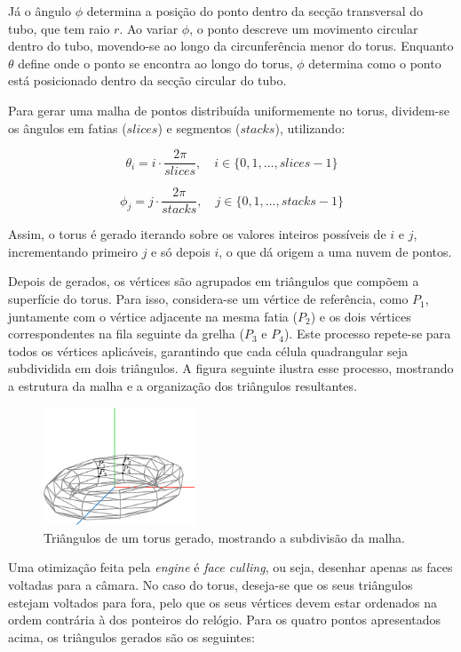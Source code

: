 \documentclass[12pt, a4paper]{article}
\begin{document}
Já o ângulo $\phi$ determina a posição do ponto dentro da secção transversal do tubo, que tem raio
$r$. Ao variar $\phi$, o ponto descreve um movimento circular dentro do tubo, movendo-se ao longo
da circunferência menor do torus. Enquanto $\theta$ define onde o ponto se encontra ao longo do
torus, $\phi$ determina como o ponto está posicionado dentro da secção circular do tubo.

Para gerar uma malha de pontos distribuída uniformemente no torus, dividem-se os ângulos em fatias
($slices$) e segmentos ($stacks$), utilizando:

$$
\theta_i = i \cdot \frac{2\pi}{slices}, \quad i \in \{0, 1, \ldots, slices-1\}
$$

$$
\phi_j = j \cdot \frac{2\pi}{stacks}, \quad j \in \{0, 1, \ldots, stacks-1\}
$$

Assim, o torus é gerado iterando sobre os valores inteiros possíveis de $i$ e $j$, incrementando
primeiro $j$ e só depois $i$, o que dá origem a uma nuvem de pontos.

Depois de gerados, os vértices são agrupados em triângulos que compõem a superfície do torus. Para
isso, considera-se um vértice de referência, como $P_1$, juntamente com o vértice adjacente na
mesma fatia ($P_2$) e os dois vértices correspondentes na fila seguinte da grelha ($P_3$ e $P_4$).
Este processo repete-se para todos os vértices aplicáveis, garantindo que cada célula quadrangular
seja subdividida em dois triângulos. A figura seguinte ilustra esse processo, mostrando a estrutura
da malha e a organização dos triângulos resultantes.

\begin{figure}[H]
    \centering
    \includegraphics[width=0.4\textwidth]{res/figures/TorusTriangle.pdf}
    \caption{
        Triângulos de um torus gerado, mostrando a subdivisão da malha.
    }
\end{figure}

Uma otimização feita pela \emph{engine} é \emph{face culling}, ou seja, desenhar apenas as faces
voltadas para a câmara. No caso do torus, deseja-se que os seus triângulos estejam voltados para
fora, pelo que os seus vértices devem estar ordenados na ordem contrária à dos ponteiros do
relógio. Para os quatro pontos apresentados acima, os triângulos gerados são os seguintes:
\end{document}
